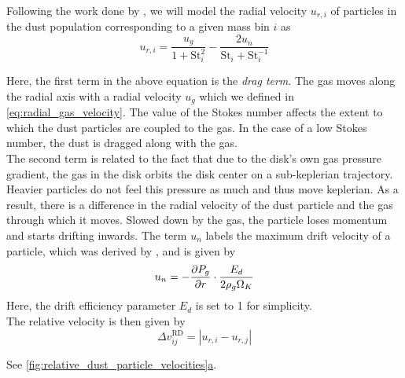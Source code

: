         Following the work done by \cite{birnstiel_dullemond_brauer_2010}, we will model the
        radial velocity $u_{r,i}$ of particles in the dust population corresponding to 
        a given mass bin $i$ as
        \begin{equation}
            \label{eq:radial_dust_velocity}
            u_{r,i}
            =\frac{u_{g}}{1+\text{St}_i^2}-\frac{2u_{n}}{\text{St}_i+\text{St}_i^{-1}}
        \end{equation}

        Here, the first term in the above equation is the \textit{drag term}. 
        The gas moves along 
        the radial axis with a radial velocity $u_g$
        which we defined in \cref{eq:radial_gas_velocity}.
        The value of the Stokes number affects 
        the extent to which the dust particles are coupled to the gas. In the case of a low 
        Stokes number, the dust is dragged along with the gas. \\

        The second term is related to the fact that due to the disk's own gas pressure 
        gradient, the gas in the disk orbits the disk center on a sub-keplerian 
        trajectory. Heavier particles do not feel this pressure as much and 
        thus move keplerian. As a result, there is a difference in the radial velocity
        of the dust particle and the gas through which it moves. Slowed down by the gas, 
        the particle loses momentum and starts drifting inwards. 
        The term $u_n$ labels the maximum drift velocity of a particle, which was derived 
        by \cite{weidenschilling_1977}, and is given by
        \begin{equation}
            u_{n}
            =-\frac{\partial P_g}{\partial r}\cdot\frac{E_d}{2\rho_g\Omega_K}
        \end{equation}
        Here, the drift efficiency parameter $E_d$ is set to 1 for simplicity. \\

        The relative velocity is then given by
        \begin{equation}
            \Delta v_{ij}^\text{RD}
            =|u_{r,i}-u_{r,j}|
        \end{equation}
    
        See \hyperref[fig:relative_dust_particle_velocities]
        {\cref*{fig:relative_dust_particle_velocities}a}.

